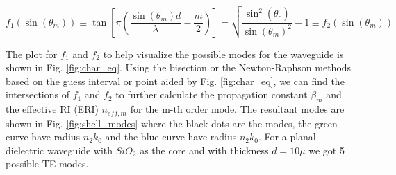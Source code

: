 \documentclass[a4paper,12pt]{article}
\begin{document}
\begin{equation}
    f_1(\sin(\theta_m)) \equiv \tan\left[ \pi \left(\frac{\sin(\theta_m) d}{\lambda} - \frac{m}{2}\right) \right] =
    \sqrt{\frac{\sin^2(\overline{\theta}_c)}{\sin(\theta_m)^2} - 1}
    \equiv f_2(\sin(\theta_m))
    \label{eq:char_eq}
\end{equation}

The plot for $f_1$ and $f_2$ to help visualize the possible modes for the waveguide is shown in Fig. \ref{fig:char_eq}. Using the bisection or the Newton-Raphson methods based on the guess interval or point aided by Fig. \ref{fig:char_eq}, we can find the intersections of $f_1$ and $f_2$ to further calculate the propagation constant $\beta_m$ and the effective RI (ERI) $n_{eff,m}$ for the m-th order mode. The resultant modes are shown in Fig. \ref{fig:shell_modes} where the black dots are the modes, the green curve have radius $n_2 k_0$ and the blue curve have radius $n_2 k_0$. For a planal dielectric waveguide with $SiO_2$ as the core and with thickness $d = 10\mu$ we got 5 possible TE modes.
\end{document}
